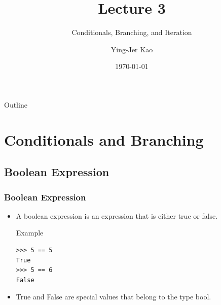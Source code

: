 \documentclass{beamer}
\title[Conditionals, Branching, and Iteration] %
{Lecture 3}
\subtitle
{Conditionals, Branching, and Iteration} %
\author[Ying-Jer Kao] %
{Ying-Jer Kao}
\institute[National Taiwan University] %
{
  Department of Physics\\
 National Taiwan University
  }
\date[Numerical Analysis and Programming] %
{\today}
\begin{document}
\begin{frame}
  \titlepage
\end{frame}

\begin{frame}{Outline}
  \tableofcontents
\end{frame}




\section{Conditionals and Branching}
\subsection[Boolean Expression]{Boolean Expression}

\begin{frame}[fragile]
\frametitle{Boolean Expression}
\begin{itemize}
\item A \alert{ boolean expression} is an expression that is either true
or false.  
\begin{block}{Example}
\tiny
\begin{verbatim}
>>> 5 == 5
True
>>> 5 == 6
False
\end{verbatim}
\end{block}
\item \alert{ True} and \alert{ False} are special
values that belong to the type \alert{bool}.
\end{itemize}
\end{frame}
\end{document}
